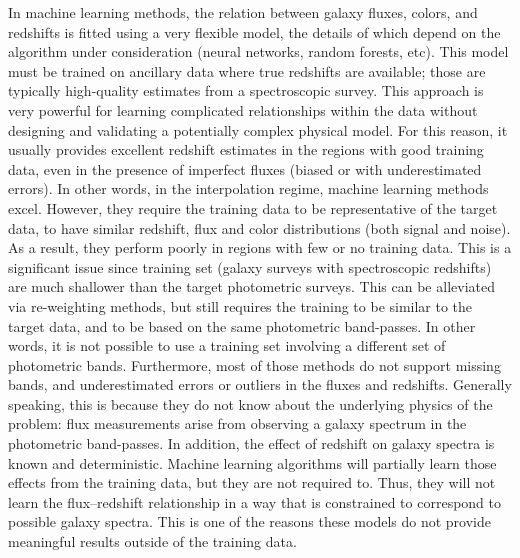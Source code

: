 \documentclass[aps,prd,showpacs,superscriptaddress,groupedaddress]{revtex4}  %
\begin{document}
In machine learning methods, the relation between galaxy fluxes, colors, and redshifts is fitted using a very flexible model, the details of which depend on the algorithm under consideration (\eg neural networks, random forests, etc).
This model must be trained on ancillary data where true redshifts are available; those are typically high-quality estimates from a spectroscopic survey.
This approach is very powerful for learning complicated relationships within the data without designing and validating a potentially complex physical model.
For this reason, it usually provides excellent redshift estimates in the regions with good training data, even in the presence of imperfect fluxes (\ie biased or with underestimated errors).
In other words, in the interpolation regime, machine learning methods excel.
However, they require the training data to be representative of the target data, \ie to have similar redshift, flux and color distributions (both signal and noise).
As a result, they perform poorly in regions with few or no training data.
This is a significant issue since training set (\ie galaxy surveys with spectroscopic redshifts) are much shallower than the target photometric surveys.
This can be alleviated via re-weighting methods, but still requires the training to be similar to the target data, and to be based on the same photometric band-passes.
In other words, it is not possible to use a training set involving a different set of photometric bands.
Furthermore, most of those methods do not support missing bands, and underestimated errors or outliers in the fluxes and redshifts.
Generally speaking, this is because they do not know about the underlying physics of the problem: flux measurements arise from observing a galaxy spectrum in the photometric band-passes.
In addition, the effect of redshift on galaxy spectra is known and deterministic.
Machine learning algorithms will partially learn those effects from the training data, but they are not required to. 
Thus, they will not learn the flux--redshift relationship in a way that is constrained to correspond to possible galaxy spectra. 
This is one of the reasons these models do not provide meaningful results outside of the training data.
\end{document}
